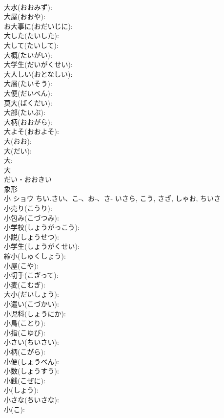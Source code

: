 \documentclass[8pt]{extreport}
\begin{document}
\begin{CJK}{UTF8}{min}
\\	大水(おおみず): 
\\	大屋(おおや): 
\\	お大事に(おだいじに): 
\\	大した(たいした): 
\\	大して(たいして): 
\\	大概(たいがい): 
\\	大学生(だいがくせい): 
\\	大人しい(おとなしい): 
\\	大層(たいそう): 
\\	大便(だいべん): 
\\	莫大(ばくだい): 
\\	大部(たいぶ): 
\\	大柄(おおがら): 
\\	大よそ(おおよそ): 
\\	大(おお): 
\\	大(だい): 
\\	大: 
\\	大	
\\	だい・おおきい	
\\	象形 
\\	小	ショウ	ちい.さい、こ-、お-、さ-	いさら, こう, さざ, しゃお, ちいさ	
\\	小売り(こうり): 
\\	小包み(こづつみ): 
\\	小学校(しょうがっこう): 
\\	小説(しょうせつ): 
\\	小学生(しょうがくせい): 
\\	縮小(しゅくしょう): 
\\	小屋(こや): 
\\	小切手(こぎって): 
\\	小麦(こむぎ): 
\\	大小(だいしょう): 
\\	小遣い(こづかい): 
\\	小児科(しょうにか): 
\\	小鳥(ことり): 
\\	小指(こゆび): 
\\	小さい(ちいさい): 
\\	小柄(こがら): 
\\	小便(しょうべん): 
\\	小数(しょうすう): 
\\	小銭(こぜに): 
\\	小(しょう): 
\\	小さな(ちいさな): 
\\	小(こ): 

\end{CJK}
\end{document}

